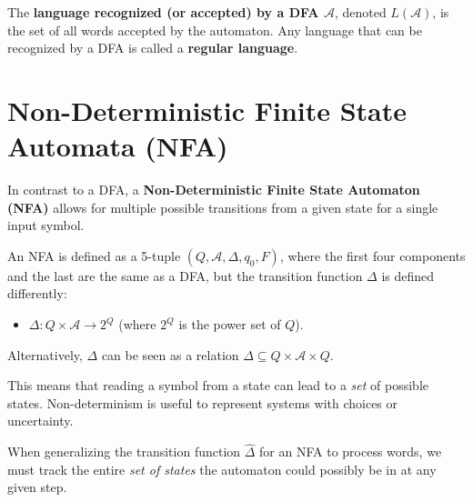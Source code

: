 The \textbf{language recognized (or accepted) by a DFA $\mathcal{A}$}, denoted $L(\mathcal{A})$, is the set of all words accepted by the automaton. Any language that can be recognized by a DFA is called a \textbf{regular language}.

\section{Non-Deterministic Finite State Automata (NFA)}

In contrast to a DFA, a \textbf{Non-Deterministic Finite State Automaton (NFA)} allows for multiple possible transitions from a given state for a single input symbol. 

An NFA is defined as a 5-tuple $(Q, \mathcal{A}, \Delta, q_0, F)$, where the first four components and the last are the same as a DFA, but the transition function $\Delta$ is defined differently:
\begin{itemize}
\item $\Delta: Q \times \mathcal{A} \rightarrow 2^Q$ (where $2^Q$ is the power set of $Q$).
\end{itemize}
Alternatively, $\Delta$ can be seen as a relation $\Delta \subseteq Q \times \mathcal{A} \times Q$.

This means that reading a symbol from a state can lead to a \emph{set} of possible states. Non-determinism is useful to represent systems with choices or uncertainty. 

When generalizing the transition function $\hat{\Delta}$ for an NFA to process words, we must track the entire \emph{set of states} the automaton could possibly be in at any given step.
